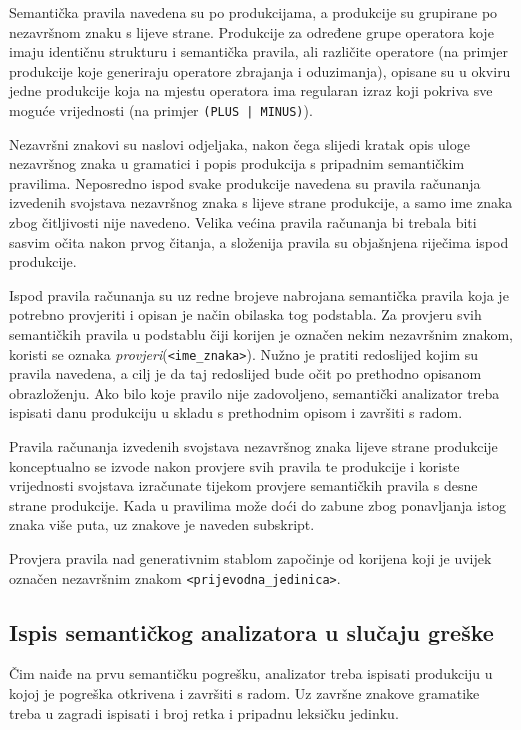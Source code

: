 \documentclass[times, 12pt, utf8]{book}
\begin{document}
Semantička pravila navedena su po produkcijama, a produkcije su grupirane po nezavršnom znaku s lijeve strane.
Produkcije za određene grupe operatora koje imaju identičnu strukturu i semantička pravila, ali različite operatore (na primjer produkcije koje generiraju operatore zbrajanja i oduzimanja), opisane su u okviru jedne produkcije koja na mjestu operatora ima regularan izraz koji pokriva sve moguće vrijednosti (na primjer \verb#(PLUS | MINUS)#).

Nezavršni znakovi su naslovi odjeljaka, nakon čega slijedi kratak opis uloge nezavršnog znaka u gramatici i popis produkcija s pripadnim semantičkim pravilima.
Neposredno ispod svake produkcije navedena su pravila računanja izvedenih svojstava nezavršnog znaka s lijeve strane produkcije, a samo ime znaka zbog čitljivosti nije navedeno.
Velika većina pravila računanja bi trebala biti sasvim očita nakon prvog čitanja, a složenija pravila su objašnjena riječima ispod produkcije.

Ispod pravila računanja su uz redne brojeve nabrojana semantička pravila koja je potrebno provjeriti i opisan je način obilaska tog podstabla.
Za provjeru svih semantičkih pravila u podstablu čiji korijen je označen nekim nezavršnim znakom, koristi se oznaka \emph{provjeri}(\verb|<ime_znaka>|).
Nužno je pratiti redoslijed kojim su pravila navedena, a cilj je da taj redoslijed bude očit po prethodno opisanom obrazloženju.
Ako bilo koje pravilo nije zadovoljeno, semantički analizator treba ispisati danu produkciju u skladu s prethodnim opisom i završiti s radom.

Pravila računanja izvedenih svojstava nezavršnog znaka lijeve strane produkcije konceptualno se izvode nakon provjere svih pravila te produkcije i koriste vrijednosti svojstava izračunate tijekom provjere semantičkih pravila s desne strane produkcije.
Kada u pravilima može doći do zabune zbog ponavljanja istog znaka više puta, uz znakove je naveden subskript.

Provjera pravila nad generativnim stablom započinje od korijena koji je uvijek označen nezavršnim znakom \verb|<prijevodna_jedinica>|.

\subsection{Ispis semantičkog analizatora u slučaju greške}
Čim naiđe na prvu semantičku pogrešku, analizator treba ispisati produkciju u kojoj je pogreška otkrivena i završiti s radom.
Uz završne znakove gramatike treba u zagradi ispisati i broj retka i pripadnu leksičku jedinku.
\end{document}
